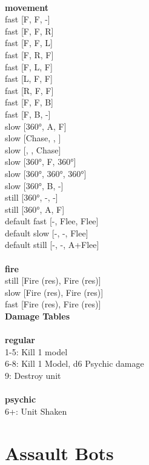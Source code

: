 \ \\ {\bf movement } \\
fast [F, F, -] \\
fast [F, F, R] \\
fast [F, F, L] \\
fast [F, R, F] \\
fast [F, L, F] \\
fast [L, F, F] \\
fast [R, F, F] \\
fast [F, F, B] \\
fast [F, B, -] \\
slow [360°, A, F] \\
slow [Chase, , ] \\
slow [, , Chase] \\
slow [360°, F, 360°] \\
slow [360°, 360°, 360°] \\
slow [360°, B, -] \\
still [360°, -, -] \\
still [360°, A, F] \\
default fast [-, Flee, Flee] \\
default slow [-, -, Flee] \\
default still [-, -, A+Flee] \\
\ \\ {\bf fire } \\
still [Fire (res), Fire (res)] \\
slow [Fire (res), Fire (res)] \\
fast [Fire (res), Fire (res)] \\


{\bf Damage Tables} \\
\ \\ {\bf regular } \\
1-5: Kill 1 model \\
6-8: Kill 1 Model, d6 Psychic damage \\
9: Destroy unit \\
\ \\ {\bf psychic } \\
6+: Unit Shaken \\










\pagebreak\pagebreak

\section{ Assault Bots }

